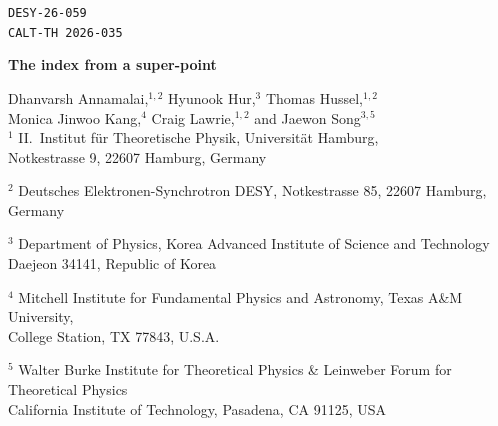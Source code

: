 \documentclass[12pt]{article}
\numberwithin{equation}{section}
\numberwithin{figure}{section}
\theoremstyle{plain}
\theoremstyle{definition}
\begin{document}
\begin{titlepage}
\vspace*{-3cm} 
\begin{flushright}
{\tt DESY-26-059}\\
{\tt CALT-TH 2026-035}
\end{flushright}
\begin{center}
\vspace{1.0cm}

{\LARGE\bfseries The index from a super-point}
\vspace{1.0cm}

{\large
Dhanvarsh Annamalai,$^{1,2}$ 
Hyunook Hur,$^{3}$
Thomas Hussel,$^{1,2}$ \\ Monica Jinwoo Kang,$^{4}$ Craig Lawrie,$^{1,2}$ and Jaewon Song$^{3,5}$\\}
\vspace{.7cm}
{$^1$ II.~Institut für Theoretische Physik, Universität Hamburg, \\ Notkestrasse 9, 22607 Hamburg, Germany}\par
{$^2$ Deutsches Elektronen-Synchrotron DESY,
Notkestrasse 85, 22607 Hamburg, Germany}\par
{$^3$ Department of Physics, Korea Advanced Institute of Science and Technology\\
Daejeon 34141, Republic of Korea}\par
{$^4$ Mitchell Institute for Fundamental Physics and Astronomy, Texas A\&M University,\\
College Station, TX 77843, U.S.A.}\par
{$^5$ Walter Burke Institute for Theoretical Physics \& Leinweber Forum for Theoretical Physics\\ California Institute of Technology, 
Pasadena, CA 91125, USA}\par


\vspace{.3cm}

\par


\end{center}
\end{titlepage}
\end{document}
